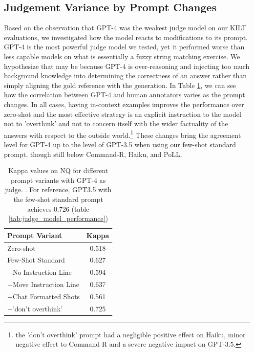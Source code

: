 \documentclass[11pt]{article}
\newcommand{\acronymnospace}{PoLL}
\begin{document}
\subsection{Judgement Variance by Prompt Changes \label{sec:prompt_variance}}
Based on the observation that GPT-4 was the weakest judge model on our KILT evaluations, we investigated how the model reacts to modifications to its prompt. GPT-4 is the most powerful judge model we tested, yet it performed worse than less capable models on what is essentially a fuzzy string matching exercise. We hypothesize that may be because GPT-4 is over-reasoning and injecting too much background knowledge into determining the correctness of an answer rather than simply aligning the gold reference with the generation. In Table \ref{tab:prompt_variants}, we can see how the correlation between GPT-4 and human annotators varies as the prompt changes. In all cases, having in-context examples improves the performance over zero-shot and the most effective strategy is an explicit instruction to the model not to 'overthink' and not to concern itself with the wider factuality of the answers with respect to the outside world.\footnote{the 'don't overthink' prompt had a negligible positive effect on Haiku, minor negative effect to Command R and a severe negative impact on GPT-3.5.} These changes bring the agreement level for GPT-4 up to the level of GPT-3.5 when using our few-shot standard prompt, though still below Command-R, Haiku, and \acronymnospace.

\begin{table}[ht]
\centering
\begin{tabular}{lc}
\toprule
\textbf{Prompt Variant} & \textbf{Kappa} \\ \midrule
Zero-shot & 0.518 \\
Few-Shot Standard & 0.627 \\
+No Instruction Line & 0.594 \\
+Move Instruction Line & 0.637 \\
+Chat Formatted Shots & 0.561 \\
+'don't overthink'& 0.725 \\ 
\bottomrule
\end{tabular}
\caption{Kappa values on NQ for different prompt variants with GPT-4 as judge. \label{tab:prompt_variants}. For reference, GPT3.5 with  the few-shot standard prompt achieves 0.726 (table \ref{tab:judge_model_performance})}
\end{table}
\end{document}
